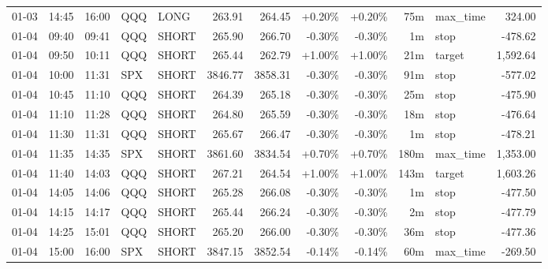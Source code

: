 \documentclass[11pt,a4paper,twoside]{article}
\begin{document}
\begin{center}
\begin{longtable}{>{\color{txtmain}}l l l l l r r r r r >{\color{txtmain}}l r}
01-03 & 14:45 & 16:00 & QQQ & LONG & 263.91 & 264.45 & \textcolor{wingreen}{+0.20\%} & \textcolor{wingreen}{+0.20\%} & 75m & max\_time & \textcolor{wingreen}{324.00} \\
01-04 & 09:40 & 09:41 & QQQ & SHORT & 265.90 & 266.70 & \textcolor{lossred}{-0.30\%} & \textcolor{lossred}{-0.30\%} & 1m & stop & \textcolor{lossred}{-478.62} \\
01-04 & 09:50 & 10:11 & QQQ & SHORT & 265.44 & 262.79 & \textcolor{wingreen}{+1.00\%} & \textcolor{wingreen}{+1.00\%} & 21m & target & \textcolor{wingreen}{1,592.64} \\
01-04 & 10:00 & 11:31 & SPX & SHORT & 3846.77 & 3858.31 & \textcolor{lossred}{-0.30\%} & \textcolor{lossred}{-0.30\%} & 91m & stop & \textcolor{lossred}{-577.02} \\
01-04 & 10:45 & 11:10 & QQQ & SHORT & 264.39 & 265.18 & \textcolor{lossred}{-0.30\%} & \textcolor{lossred}{-0.30\%} & 25m & stop & \textcolor{lossred}{-475.90} \\
01-04 & 11:10 & 11:28 & QQQ & SHORT & 264.80 & 265.59 & \textcolor{lossred}{-0.30\%} & \textcolor{lossred}{-0.30\%} & 18m & stop & \textcolor{lossred}{-476.64} \\
01-04 & 11:30 & 11:31 & QQQ & SHORT & 265.67 & 266.47 & \textcolor{lossred}{-0.30\%} & \textcolor{lossred}{-0.30\%} & 1m & stop & \textcolor{lossred}{-478.21} \\
01-04 & 11:35 & 14:35 & SPX & SHORT & 3861.60 & 3834.54 & \textcolor{wingreen}{+0.70\%} & \textcolor{wingreen}{+0.70\%} & 180m & max\_time & \textcolor{wingreen}{1,353.00} \\
01-04 & 11:40 & 14:03 & QQQ & SHORT & 267.21 & 264.54 & \textcolor{wingreen}{+1.00\%} & \textcolor{wingreen}{+1.00\%} & 143m & target & \textcolor{wingreen}{1,603.26} \\
01-04 & 14:05 & 14:06 & QQQ & SHORT & 265.28 & 266.08 & \textcolor{lossred}{-0.30\%} & \textcolor{lossred}{-0.30\%} & 1m & stop & \textcolor{lossred}{-477.50} \\
01-04 & 14:15 & 14:17 & QQQ & SHORT & 265.44 & 266.24 & \textcolor{lossred}{-0.30\%} & \textcolor{lossred}{-0.30\%} & 2m & stop & \textcolor{lossred}{-477.79} \\
01-04 & 14:25 & 15:01 & QQQ & SHORT & 265.20 & 266.00 & \textcolor{lossred}{-0.30\%} & \textcolor{lossred}{-0.30\%} & 36m & stop & \textcolor{lossred}{-477.36} \\
01-04 & 15:00 & 16:00 & SPX & SHORT & 3847.15 & 3852.54 & \textcolor{lossred}{-0.14\%} & \textcolor{lossred}{-0.14\%} & 60m & max\_time & \textcolor{lossred}{-269.50} \\

\end{longtable}
\end{center}
\end{document}
